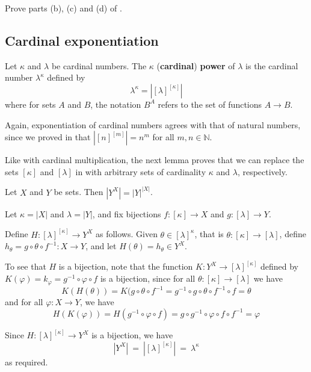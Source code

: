 \begin{exercise}
Prove parts (b), (c) and (d) of .
\end{exercise}

\subsection*{Cardinal exponentiation}

\begin{definition}
\label{defCardinalExponential}
Let $\kappa$ and $\lambda$ be cardinal numbers. The $\kappa$\supth{} (\textbf{cardinal}) \textbf{power} of $\lambda$ is the cardinal number $\lambda^{\kappa}$ defined by
\[ \lambda^{\kappa} = |[\lambda]^{[\kappa]}|\]
where for sets $A$ and $B$, the notation $B^A$ refers to the set of functions $A \to B$.
\end{definition}

Again, exponentiation of cardinal numbers agrees with that of natural numbers, since we proved in  that $|[n]^{[m]}| = n^m$ for all $m,n \in \mathbb{N}$.

Like with cardinal multiplication, the next lemma proves that we can replace the sets $[\kappa]$ and $[\lambda]$ in  with arbitrary sets of cardinality $\kappa$ and $\lambda$, respectively.

\begin{lemma}
\label{lemCardinalityOfFunctionSet}
Let $X$ and $Y$ be sets. Then $|Y^X| = |Y|^{|X|}$.
\end{lemma}

\begin{cproof}
Let $\kappa = |X|$ and $\lambda = |Y|$, and fix bijections $f : [\kappa] \to X$ and $g : [\lambda] \to Y$.

Define $H : [\lambda]^{[\kappa]} \to Y^X$ as follows. Given $\theta \in [\lambda]^{\kappa}$, that is $\theta : [\kappa] \to [\lambda]$, define $h_{\theta} = g \circ \theta \circ f^{-1} : X \to Y$, and let $H(\theta) = h_{\theta} \in Y^X$.

To see that $H$ is a bijection, note that the function $K : Y^X \to [\lambda]^{[\kappa]}$ defined by $K(\varphi) = k_{\varphi} = g^{-1} \circ \varphi \circ f$ is a bijection, since for all $\theta : [\kappa] \to [\lambda]$ we have
\[ K(H(\theta)) = K(g \circ \theta \circ f^{-1} = g^{-1} \circ g \circ \theta \circ f^{-1} \circ f = \theta \]
and for all $\varphi : X \to Y$, we have
\[ H(K(\varphi)) = H(g^{-1} \circ \varphi \circ f) = g \circ g^{-1} \circ \varphi \circ f \circ f^{-1} = \varphi \]

Since $H : [\lambda]^{[\kappa]} \to Y^X$ is a bijection, we have
\[ |Y^X| ~=~ |[\lambda]^{[\kappa]}| ~=~ \lambda^{\kappa}\]
as required.
\end{cproof}

